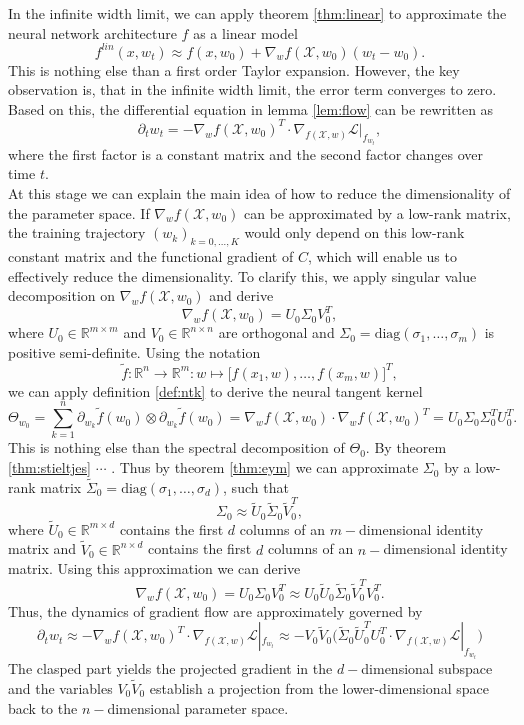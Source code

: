 \documentclass[11pt, a4paper]{article}
\newcommand{\R}{\mathds{R}}
\newcommand{\X}{\mathcal{X}}
\renewcommand{\L}{\mathcal{L}}
\begin{document}
In the infinite width limit, we can apply theorem \ref{thm:linear} to approximate the neural network architecture $f$ as a linear model
\[ f^\textit{lin}(x, w_t) \approx f(x, w_0) + \nabla_wf(\X,w_0)(w_t-w_0). \]
This is nothing else than a first order Taylor expansion. However, the key observation is, that in the infinite width limit, the error term converges to zero. Based on this, the differential equation in lemma \ref{lem:flow} can be rewritten as
\[ \partial_tw_t = -\nabla_wf(\X,w_0)^T \cdot \nabla_{f(\X,w)} \L|_{f_{w_t}}, \]
where the first factor is a constant matrix and the second factor changes over time $t$. \\

At this stage we can explain the main idea of how to reduce the dimensionality of the parameter space. If $\nabla_wf(\X,w_0)$ can be approximated by a low-rank matrix, the training trajectory $(w_k)_{k=0, \dots, K}$ would only depend on this low-rank constant matrix and the functional gradient of $C$, which will enable us to effectively reduce the dimensionality. To clarify this, we apply singular value decomposition on $\nabla_wf(\X,w_0)$ and derive
\[ \nabla_wf(\X,w_0) = U_0 \Sigma_0 V_0^T, \]
where $U_0 \in \R^{m \times m}$ and $V_0 \in \R^{n \times n}$ are orthogonal and $\Sigma_0 = \text{diag}(\sigma_1, \dots, \sigma_m)$ is positive semi-definite. Using the notation
\[ \tilde{f}: \R^n \to \R^m : w \mapsto \Big [ f(x_1,w), \dots, f(x_m,w) \Big ]^T, \]
we can apply definition \ref{def:ntk} to derive the neural tangent kernel
\[ \Theta_{w_0} = \sum_{k=1}^{n} \partial_{w_k} \tilde{f}(w_0) \otimes \partial_{w_k} \tilde{f}(w_0) = \nabla_wf(\X,w_0) \cdot \nabla_wf(\X,w_0)^T = U_0 \Sigma_0 \Sigma_0^T U_0^T. \]
This is nothing else than the spectral decomposition of $\Theta_0$. By theorem \ref{thm:stieltjes} $\cdots$ . Thus by theorem \ref{thm:eym} we can approximate $\Sigma_0$ by a low-rank matrix $\tilde{\Sigma}_0 = \text{diag}(\sigma_1, \dots, \sigma_d)$, such that
\[ \Sigma_0 \approx \tilde{U}_0 \tilde{\Sigma}_0 \tilde{V}_0^T, \]
where $\tilde{U}_0 \in \R^{m \times d}$ contains the first $d$ columns of an $m-$dimensional identity matrix and $\tilde{V}_0 \in \R^{n \times d}$ contains the first $d$ columns of an $n-$dimensional identity matrix. Using this approximation we can derive
\[ \nabla_wf(\X,w_0) = U_0 \Sigma_0 V_0^T \approx U_0 \tilde{U}_0 \tilde{\Sigma}_0 \tilde{V}_0^T V_0^T. \]
Thus, the dynamics of gradient flow are approximately governed by
\[ \partial_t w_t \approx -\nabla_wf(\X,w_0)^T \cdot \nabla_{f(\X,w)} \L|_{f_{w_t}} \approx - V_0 \tilde{V}_0 \Big ( \tilde{\Sigma}_0 \tilde{U}_0^T U_0^T \cdot \nabla_{f(\X,w)} \L|_{f_{w_t}} \Big ) \]
The clasped part yields the projected gradient in the $d-$dimensional subspace and the variables $V_0 \tilde{V}_0$ establish a projection from the lower-dimensional space back to the $n-$dimensional parameter space. \\
\end{document}
